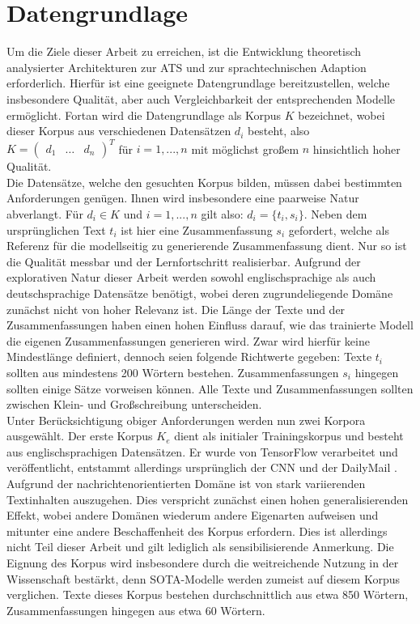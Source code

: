 \chapter{Datengrundlage}
\thispagestyle{fancy}
\label{chap:Datengrundlage}

\noindent
Um die Ziele dieser Arbeit zu erreichen, ist die Entwicklung theoretisch analysierter Architekturen zur \ac{ATS} und zur sprachtechnischen Adaption erforderlich. Hierfür ist eine geeignete Datengrundlage bereitzustellen, welche insbesondere Qualität, aber auch Vergleichbarkeit der entsprechenden Modelle ermöglicht. Fortan wird die Datengrundlage als Korpus $K$ bezeichnet, wobei dieser Korpus aus verschiedenen Datensätzen $d_i$ besteht, also $K=\begin{pmatrix} d_1 & \dots & d_n \end{pmatrix}^{T}$ für $i=1,...,n$ mit möglichst großem $n$ hinsichtlich hoher Qualität.\\

\noindent
Die Datensätze, welche den gesuchten Korpus bilden, müssen dabei bestimmten Anforderungen genügen. Ihnen wird insbesondere eine paarweise Natur abverlangt. Für $d_i \in K$ und $i=1,...,n$ gilt also: $d_i=\{t_i,s_i\}$. Neben dem ursprünglichen Text $t_i$ ist hier eine Zusammenfassung $s_i$ gefordert, welche als Referenz für die modellseitig zu generierende Zusammenfassung dient. Nur so ist die Qualität messbar und der Lernfortschritt realisierbar. Aufgrund der explorativen Natur dieser Arbeit werden sowohl englischsprachige als auch deutschsprachige Datensätze benötigt, wobei deren zugrundeliegende Domäne zunächst nicht von hoher Relevanz ist. Die Länge der Texte und der Zusammenfassungen haben einen hohen Einfluss darauf, wie das trainierte Modell die eigenen Zusammenfassungen generieren wird. Zwar wird hierfür keine Mindestlänge definiert, dennoch seien folgende Richtwerte gegeben: Texte $t_i$ sollten aus mindestens 200 Wörtern bestehen. Zusammenfassungen $s_i$ hingegen sollten einige Sätze vorweisen können. Alle Texte und Zusammenfassungen sollten zwischen Klein- und Großschreibung unterscheiden.\\

\noindent
Unter Berücksichtigung obiger Anforderungen werden nun zwei Korpora ausgewählt. Der erste Korpus $K_e$ dient als initialer Trainingskorpus und besteht aus englischsprachigen Datensätzen. Er wurde von TensorFlow verarbeitet und veröffentlicht, entstammt allerdings ursprünglich der CNN und der DailyMail \cite{TEN21}. Aufgrund der nachrichtenorientierten Domäne ist von stark variierenden Textinhalten auszugehen. Dies verspricht zunächst einen hohen generalisierenden Effekt, wobei andere Domänen wiederum andere Eigenarten aufweisen und mitunter eine andere Beschaffenheit des Korpus erfordern. Dies ist allerdings nicht Teil dieser Arbeit und gilt lediglich als sensibilisierende Anmerkung. Die Eignung des Korpus wird insbesondere durch die weitreichende Nutzung in der Wissenschaft bestärkt, denn \ac{SOTA}-Modelle werden zumeist auf diesem Korpus verglichen. Texte dieses Korpus bestehen durchschnittlich aus etwa 850 Wörtern, Zusammenfassungen hingegen aus etwa 60 Wörtern.\\

